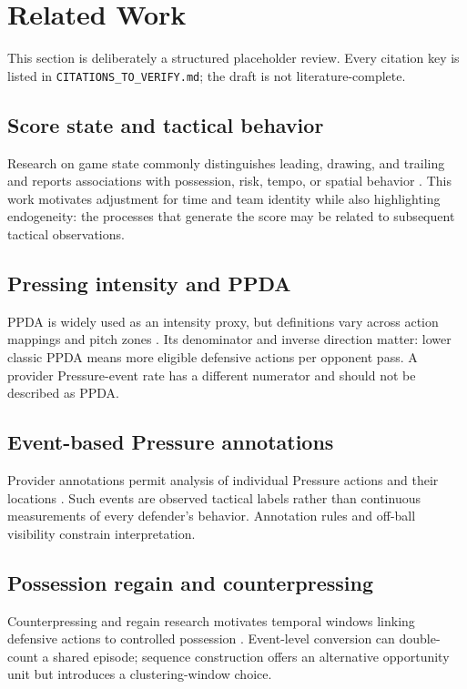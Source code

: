 \section{Related Work}

This section is deliberately a structured placeholder review. Every citation key is listed in \texttt{CITATIONS\_TO\_VERIFY.md}; the draft is not literature-complete.

\subsection{Score state and tactical behavior}
Research on game state commonly distinguishes leading, drawing, and trailing and reports associations with possession, risk, tempo, or spatial behavior \citep{VERIFY_SCORE_STATE_REFERENCE}. This work motivates adjustment for time and team identity while also highlighting endogeneity: the processes that generate the score may be related to subsequent tactical observations.

\subsection{Pressing intensity and PPDA}
PPDA is widely used as an intensity proxy, but definitions vary across action mappings and pitch zones \citep{VERIFY_PPDA_REFERENCE}. Its denominator and inverse direction matter: lower classic PPDA means more eligible defensive actions per opponent pass. A provider Pressure-event rate has a different numerator and should not be described as PPDA.

\subsection{Event-based Pressure annotations}
Provider annotations permit analysis of individual Pressure actions and their locations \citep{VERIFY_PRESSURE_EVENT_REFERENCE}. Such events are observed tactical labels rather than continuous measurements of every defender's behavior. Annotation rules and off-ball visibility constrain interpretation.

\subsection{Possession regain and counterpressing}
Counterpressing and regain research motivates temporal windows linking defensive actions to controlled possession \citep{VERIFY_REGAIN_REFERENCE}. Event-level conversion can double-count a shared episode; sequence construction offers an alternative opportunity unit but introduces a clustering-window choice.

